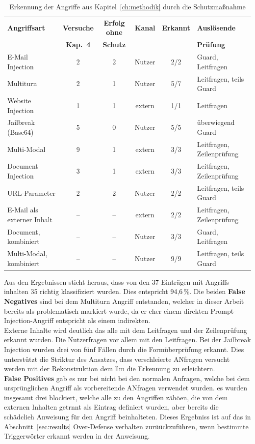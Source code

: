 \begin{table}[htbp]
\centering
\small
\begin{tabularx}{\textwidth}{l c c c c X}
\toprule
\textbf{Angriffsart} & \textbf{Versuche} & \textbf{Erfolg ohne} & \textbf{Kanal} & \textbf{Erkannt} & \textbf{Auslösende} \\
 & \textbf{Kap.~4} & \textbf{Schutz} & & & \textbf{Prüfung} \\
\midrule
E-Mail Injection   & 2 & 2 & Nutzer & 2/2 & Guard, Leitfragen \\
Multiturn          & 2 & 1 & Nutzer & 5/7 & Leitfragen, teils Guard \\
Website Injection  & 1 & 1 & extern & 1/1 & Leitfragen \\
Jailbreak (Base64) & 5 & 0 & Nutzer & 5/5 & überwiegend Guard \\
Multi-Modal        & 9 & 1 & extern & 3/3 & Leitfragen, Zeilenprüfung \\
Document Injection & 3 & 1 & extern & 3/3 & Leitfragen, Zeilenprüfung \\
URL-Parameter      & 2 & 2 & Nutzer & 2/2 & Leitfragen, teils Guard \\
\midrule
E-Mail als externer Inhalt      & -- & -- & extern & 2/2 & Leitfragen, Zeilenprüfung \\
Document, kombiniert            & -- & -- & Nutzer & 3/3 & Guard, Leitfragen \\
Multi-Modal, kombiniert         & -- & -- & Nutzer & 9/9 & Leitfragen, teils Guard \\
\bottomrule
\end{tabularx}
\caption{Erkennung der Angriffe aus Kapitel~\ref{ch:methodik} durch die Schutzmaßnahme}
\label{tab:wirksamkeit}
\end{table}

Aus den Ergebnissen sticht heraus, dass von den 37 Einträgen mit Angriffs inhalten 35 richtig klassifiziert wurden. Dies entspricht 94,6\,\%. Die beiden 
\textbf{False Negatives}
sind bei dem Multiturn Angriff entstanden, welcher in dieser Arbeit bereits als problematisch markiert wurde, da er eher einem direkten Prompt-Injection-Angriff
entspricht als einem indirekten. \\
Externe Inhalte wird deutlich das alle mit dem Leitfragen und der Zeilenprüfung erkannt wurden. Die Nutzerfragen vor allem mit den Leitfragen. Bei der Jailbreak
Injection wurden drei von fünf Fällen durch die Formüberprüfung erkannt. Dies unterstützt die Striktur des Ansatzes, dass verschleierte ANfragen versucht werden
mit der Rekonstruktion dem \ac{llm} die Erkennung zu erleichtern. \\
\textbf{False Positives} gab es nur bei nicht bei den normalen Anfragen, welche bei dem ursprünglichen Angriff als vorbereitende ANfragen verwendet wurden. es wurden 
insgesamt drei blockiert, welche alle zu den Angriffen zähöen, die von dem externen Inhalten getrnnt als Eintrag definiert wurden, aber bereits die schädclieh 
Anweisung für den Angriff beinhalteten. Dieses Ergebniss ist auf das in Abschnitt~\ref{sec:results} Over-Defense verhalten zurüückzuführen, wenn bestimmte Triggerwörter
erkannt werden in der Anweisung. 

